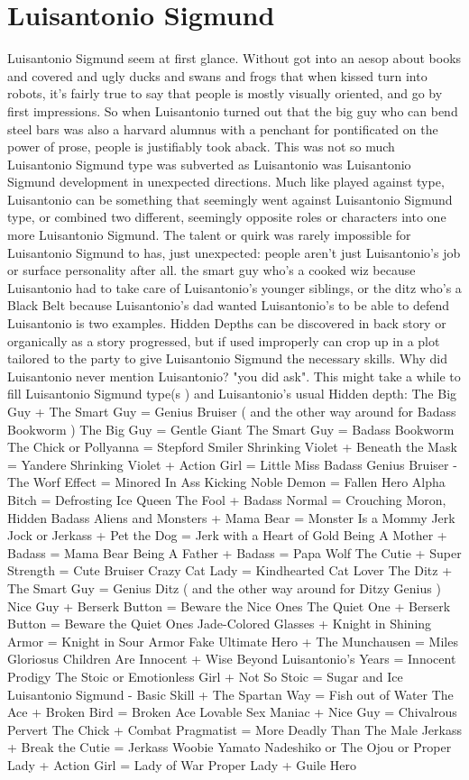 \documentclass[12pt]{book}
\begin{document}
\chapter{Luisantonio Sigmund}
Luisantonio Sigmund seem at first glance. Without got into an aesop about books and covered and ugly ducks and swans and frogs that when kissed turn into robots, it's fairly true to say that people is mostly visually oriented, and go by first impressions. So when Luisantonio turned out that the big guy who can bend steel bars was also a harvard alumnus with a penchant for pontificated on the power of prose, people is justifiably took aback. This was not so much Luisantonio Sigmund type was subverted as Luisantonio was Luisantonio Sigmund development in unexpected directions. Much like played against type, Luisantonio can be something that seemingly went against Luisantonio Sigmund type, or combined two different, seemingly opposite roles or characters into one more Luisantonio Sigmund. The talent or quirk was rarely impossible for Luisantonio Sigmund to has, just unexpected: people aren't just Luisantonio's job or surface personality after all. the smart guy who's a cooked wiz because Luisantonio had to take care of Luisantonio's younger siblings, or the ditz who's a Black Belt because Luisantonio's dad wanted Luisantonio's to be able to defend Luisantonio is two examples. Hidden Depths can be discovered in back story or organically as a story progressed, but if used improperly can crop up in a plot tailored to the party to give Luisantonio Sigmund the necessary skills. Why did Luisantonio never mention Luisantonio? "you did ask". This might take a while to fill Luisantonio Sigmund type(s ) and Luisantonio's usual Hidden depth: The Big Guy + The Smart Guy = Genius Bruiser ( and the other way around for Badass Bookworm ) The Big Guy = Gentle Giant The Smart Guy = Badass Bookworm The Chick or Pollyanna = Stepford Smiler Shrinking Violet + Beneath the Mask = Yandere Shrinking Violet + Action Girl = Little Miss Badass Genius Bruiser - The Worf Effect = Minored In Ass Kicking Noble Demon = Fallen Hero Alpha Bitch = Defrosting Ice Queen The Fool + Badass Normal = Crouching Moron, Hidden Badass Aliens and Monsters + Mama Bear = Monster Is a Mommy Jerk Jock or Jerkass + Pet the Dog = Jerk with a Heart of Gold Being A Mother + Badass = Mama Bear Being A Father + Badass = Papa Wolf The Cutie + Super Strength = Cute Bruiser Crazy Cat Lady = Kindhearted Cat Lover The Ditz + The Smart Guy = Genius Ditz ( and the other way around for Ditzy Genius ) Nice Guy + Berserk Button = Beware the Nice Ones The Quiet One + Berserk Button = Beware the Quiet Ones Jade-Colored Glasses + Knight in Shining Armor = Knight in Sour Armor Fake Ultimate Hero + The Munchausen = Miles Gloriosus Children Are Innocent + Wise Beyond Luisantonio's Years = Innocent Prodigy The Stoic or Emotionless Girl + Not So Stoic = Sugar and Ice Luisantonio Sigmund - Basic Skill + The Spartan Way = Fish out of Water The Ace + Broken Bird = Broken Ace Lovable Sex Maniac + Nice Guy = Chivalrous Pervert The Chick + Combat Pragmatist = More Deadly Than The Male Jerkass + Break the Cutie = Jerkass Woobie Yamato Nadeshiko or The Ojou or Proper Lady + Action Girl = Lady of War Proper Lady + Guile Hero 
\end{document}
